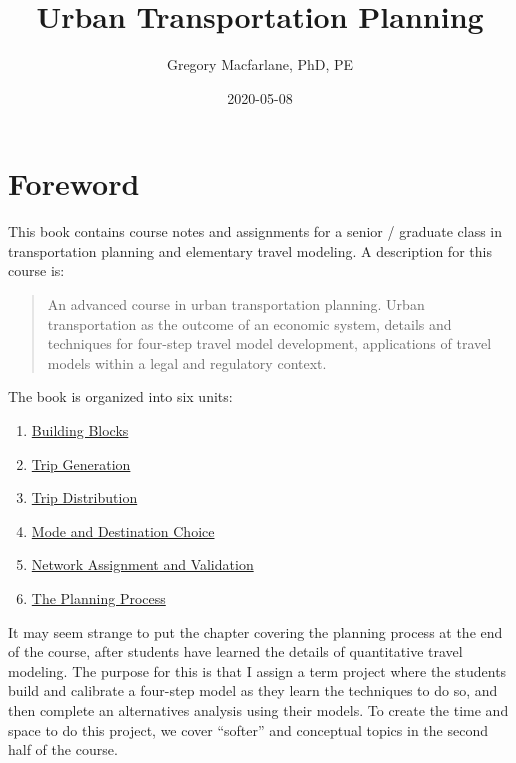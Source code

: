 \documentclass[]{book}
\title{Urban Transportation Planning}
\author{Gregory Macfarlane, PhD, PE}
\date{2020-05-08}
\providecommand{\tightlist}{%
  \setlength{\itemsep}{0pt}\setlength{\parskip}{0pt}}
\begin{document}
\maketitle

{
\setcounter{tocdepth}{1}
\tableofcontents
}
\hypertarget{syllabus}{%
\chapter*{Foreword}\label{syllabus}}

This book contains course notes and assignments for a senior / graduate class in
transportation planning and elementary travel modeling. A description for this course
is:

\begin{quote}
An advanced course in urban transportation planning. Urban transportation as
the outcome of an economic system, details and techniques for four-step travel
model development, applications of travel models within a legal and regulatory
context.
\end{quote}

The book is organized into six units:

\begin{enumerate}
\def\labelenumi{\arabic{enumi}.}
\tightlist
\item
  \protect\hyperlink{chap-blocks}{Building Blocks}
\item
  \protect\hyperlink{chap-tripgen}{Trip Generation}
\item
  \protect\hyperlink{chap-distribution}{Trip Distribution}
\item
  \protect\hyperlink{chap-modechoice}{Mode and Destination Choice}
\item
  \protect\hyperlink{chap-assignment}{Network Assignment and Validation}
\item
  \protect\hyperlink{chap-process}{The Planning Process}
\end{enumerate}

It may seem strange to put the chapter covering the planning process at the end
of the course, after students have learned the details of quantitative travel
modeling. The purpose for this is that I assign a term project where the
students build and calibrate a four-step model as they learn the techniques to do
so, and then complete an alternatives analysis using their models. To create
the time and space to do this project, we cover ``softer'' and conceptual topics
in the second half of the course.
\end{document}
